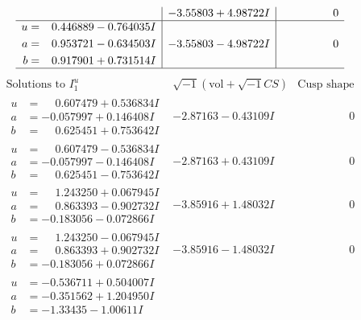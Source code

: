 \documentclass[1p]{elsarticle_modified}
\theoremstyle{definition}
\newcommand{\I}{\sqrt{-1}}
\begin{document}
$$\begin{array}{c|c|c}
 & -3.55803 + 4.98722 I & \phantom{-0.000000 } 0 \\ \hline\begin{aligned}
u &= \phantom{-}0.446889 - 0.764035 I \\
a &= \phantom{-}0.953721 - 0.634503 I \\
b &= \phantom{-}0.917901 + 0.731514 I\end{aligned}
 & -3.55803 - 4.98722 I & \phantom{-0.000000 } 0\\
 \hline 
 \end{array}$$\newpage$$\begin{array}{c|c|c}  
\text{Solutions to }I^u_{1}& \I (\text{vol} + \sqrt{-1}CS) & \text{Cusp shape}\\
 \hline 
\begin{aligned}
u &= \phantom{-}0.607479 + 0.536834 I \\
a &= -0.057997 + 0.146408 I \\
b &= \phantom{-}0.625451 + 0.753642 I\end{aligned}
 & -2.87163 - 0.43109 I & \phantom{-0.000000 } 0 \\ \hline\begin{aligned}
u &= \phantom{-}0.607479 - 0.536834 I \\
a &= -0.057997 - 0.146408 I \\
b &= \phantom{-}0.625451 - 0.753642 I\end{aligned}
 & -2.87163 + 0.43109 I & \phantom{-0.000000 } 0 \\ \hline\begin{aligned}
u &= \phantom{-}1.243250 + 0.067945 I \\
a &= \phantom{-}0.863393 - 0.902732 I \\
b &= -0.183056 - 0.072866 I\end{aligned}
 & -3.85916 + 1.48032 I & \phantom{-0.000000 } 0 \\ \hline\begin{aligned}
u &= \phantom{-}1.243250 - 0.067945 I \\
a &= \phantom{-}0.863393 + 0.902732 I \\
b &= -0.183056 + 0.072866 I\end{aligned}
 & -3.85916 - 1.48032 I & \phantom{-0.000000 } 0 \\ \hline\begin{aligned}
u &= -0.536711 + 0.504007 I \\
a &= -0.351562 + 1.204950 I \\
b &= -1.33435 - 1.00611 I\end{aligned}

\end{array}$$
\end{document}
